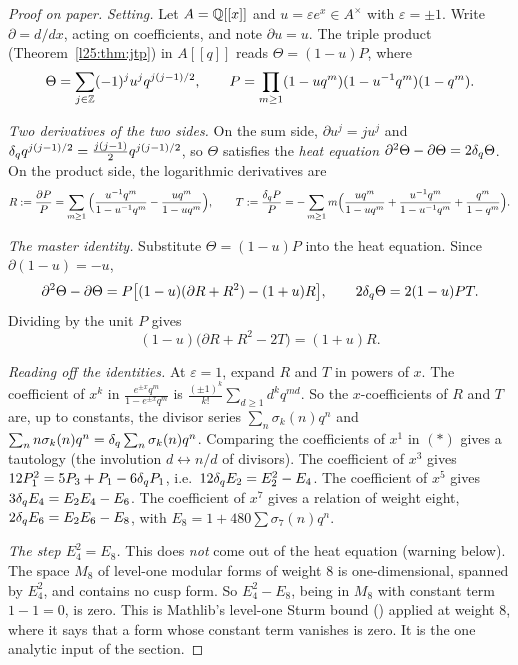 \begin{proof}[Proof on paper]
\emph{Setting.} Let $A={\mathbb{Q}}[[x]]$ and $u=\varepsilon e^x\in A^\times$ with $\varepsilon=\pm1$. Write $\partial=d/dx$, acting on
coefficients, and note $\partial u=u$. The triple product (Theorem~\ref{l25:thm:jtp}) in $A[[q]]$ reads
$\Theta=(1-u)P$, where
\begin{equation*}
\Theta=\sum_{j\in{\mathbb{Z}}}(-1)^ju^jq^{j(j-1)/2},\qquad P=\prod_{m\ge1}(1-uq^m)(1-u^{-1}q^m)(1-q^m).
\end{equation*}

\emph{Two derivatives of the two sides.} On the sum side, $\partial u^j=ju^j$ and $\delta_q q^{j(j-1)/2}=\frac{j(j-1)}2q^{j(j-1)/2}$,
so $\Theta$ satisfies the \emph{heat equation} $\partial^2\Theta-\partial\Theta=2\delta_q\Theta$. On the product side,
the logarithmic derivatives are
\begin{equation*}
R:=\frac{\partial P}{P}=\sum_{m\ge1}\Big(\frac{u^{-1}q^m}{1-u^{-1}q^m}-\frac{uq^m}{1-uq^m}\Big),\qquad
T:=\frac{\delta_q P}{P}=-\sum_{m\ge1}m\Big(\frac{uq^m}{1-uq^m}+\frac{u^{-1}q^m}{1-u^{-1}q^m}+\frac{q^m}{1-q^m}\Big).
\end{equation*}

\emph{The master identity.} Substitute $\Theta=(1-u)P$ into the heat equation. Since $\partial(1-u)=-u$,
\begin{equation*}
\partial^2\Theta-\partial\Theta=P\big[(1-u)(\partial R+R^2)-(1+u)R\big],\qquad 2\delta_q\Theta=2(1-u)PT .
\end{equation*}
Dividing by the unit $P$ gives
\begin{equation*}
(1-u)\big(\partial R+R^2-2T\big)=(1+u)R. \tag{$*$}
\end{equation*}

\emph{Reading off the identities.} At $\varepsilon=1$, expand $R$ and $T$ in powers of $x$. The coefficient of $x^{k}$ in
$\frac{e^{\pm x}q^m}{1-e^{\pm x}q^m}$ is $\frac{(\pm1)^k}{k!}\sum_{d\ge1}d^kq^{md}$. So the $x$-coefficients of $R$ and $T$ are,
up to constants, the divisor series $\sum_n\sigma_k(n)q^n$ and $\sum_nn\sigma_{k}(n)q^n=\delta_q\sum_n\sigma_k(n)q^n$.
Comparing the coefficients of $x^1$ in $(*)$ gives a tautology (the involution $d\leftrightarrow n/d$ of divisors). The
coefficient of $x^3$ gives $12P_1^2=5P_3+P_1-6\delta_q P_1$, i.e.\ $12\delta_q E_2=E_2^2-E_4$. The coefficient
of $x^5$ gives $3\delta_q E_4=E_2E_4-E_6$. The coefficient of $x^7$ gives a relation of weight eight,
$2\delta_q E_6=E_2E_6-E_8$, with $E_8=1+480\sum\sigma_7(n)q^n$.

\emph{The step $E_4^2=E_8$.} This does \emph{not} come out of the heat equation (warning below). The space $M_8$ of
level-one modular forms of weight $8$ is one-dimensional, spanned by $E_4^2$, and contains no cusp form. So $E_4^2-E_8$,
being in $M_8$ with constant term $1-1=0$, is zero. This is Mathlib's level-one Sturm bound
() applied at weight $8$, where it says that a form whose constant term vanishes is
zero. It is the one analytic input of the section.
\end{proof}
